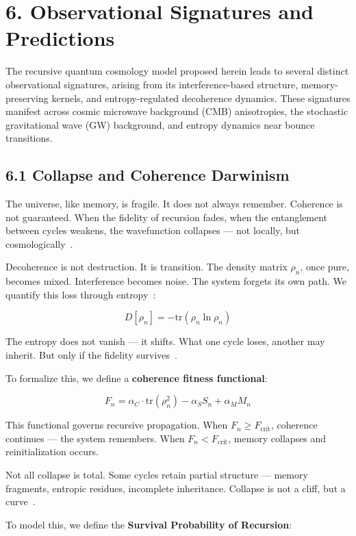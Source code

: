 \section*{6. Observational Signatures and Predictions}

The recursive quantum cosmology model proposed herein leads to several distinct observational signatures, arising from its interference-based structure, memory-preserving kernels, and entropy-regulated decoherence dynamics. These signatures manifest across cosmic microwave background (CMB) anisotropies, the stochastic gravitational wave (GW) background, and entropy dynamics near bounce transitions.
\subsection*{6.1 Collapse and Coherence Darwinism}

The universe, like memory, is fragile. It does not always remember. Coherence is not guaranteed. When the fidelity of recursion fades, when the entanglement between cycles weakens, the wavefunction collapses --- not locally, but cosmologically~\cite{zurek_decoherence_2003,tegmark_consciousness_2000}.

Decoherence is not destruction. It is transition. The density matrix \( \rho_n \), once pure, becomes mixed. Interference becomes noise. The system forgets its own path. We quantify this loss through entropy~\cite{schlosshauer_decoherence_2007}:

\[
D[\rho_n] = -\mathrm{tr}(\rho_n \ln \rho_n)
\]

The entropy does not vanish --- it shifts. What one cycle loses, another may inherit. But only if the fidelity survives~\cite{lloyd_quantum_1988}.

To formalize this, we define a \textbf{coherence fitness functional}:

\[
F_n = \alpha_C \cdot \mathrm{tr}(\rho_n^2) - \alpha_S S_n + \alpha_M M_n
\]

This functional governs recursive propagation. When \( F_n \geq F_{\text{crit}} \), coherence continues --- the system remembers. When \( F_n < F_{\text{crit}} \), memory collapses and reinitialization occurs.

Not all collapse is total. Some cycles retain partial structure --- memory fragments, entropic residues, incomplete inheritance. Collapse is not a cliff, but a curve~\cite{zurek_quantum_2009}.

To model this, we define the \textbf{Survival Probability of Recursion}:

